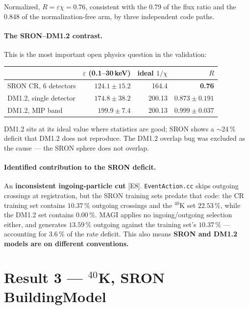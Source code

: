 \documentclass[11pt,a4paper]{article}
\newcommand{\ev}[1]{{\footnotesize\textcolor{prov}{[#1]}}}
\begin{document}
Normalized, $R = \varepsilon\chi = \mathbf{0.76}$, consistent with the 0.79 of
the flux ratio and the 0.848 of the normalization-free arm, by three
independent code paths.

\paragraph{The SRON--DM1.2 contrast.} This is the most important open physics
question in the validation:

\begin{center}
\begin{tabular}{lrrr}
\toprule
 & $\varepsilon$ (0.1--30\,keV) & ideal $1/\chi$ & $R$ \\
\midrule
SRON CR, 6 detectors  & $124.1 \pm 15.2$ & 164.4  & \textbf{0.76} \\
DM1.2, single detector& $174.8 \pm 38.2$ & 200.13 & $0.873 \pm 0.191$ \\
DM1.2, MIP band       & $199.9 \pm 7.4$  & 200.13 & $0.999 \pm 0.037$ \\
\bottomrule
\end{tabular}
\end{center}

DM1.2 sits at its ideal value where statistics are good; SRON shows a
$\sim$24\,\% deficit that DM1.2 does not reproduce. The DM1.2 overlap bug was
excluded as the cause --- the SRON sphere does not overlap.

\paragraph{Identified contribution to the SRON deficit.}
An \textbf{inconsistent ingoing-particle cut} \ev{E8}. \texttt{EventAction.cc}
skips outgoing crossings at registration, but the SRON training sets predate
that code: the CR training set contains $10.37\,\%$ outgoing crossings and the
$^{40}$K set $22.53\,\%$, while the DM1.2 set contains $0.00\,\%$. MAGI applies
no ingoing/outgoing selection either, and generates $13.59\,\%$ outgoing against
the training set's $10.37\,\%$ --- accounting for $3.6\,\%$ of the rate deficit.
This also means \textbf{SRON and DM1.2 models are on different conventions.}

\section{Result 3 --- $^{40}$K, SRON BuildingModel}
\label{sec:k40}
\end{document}
